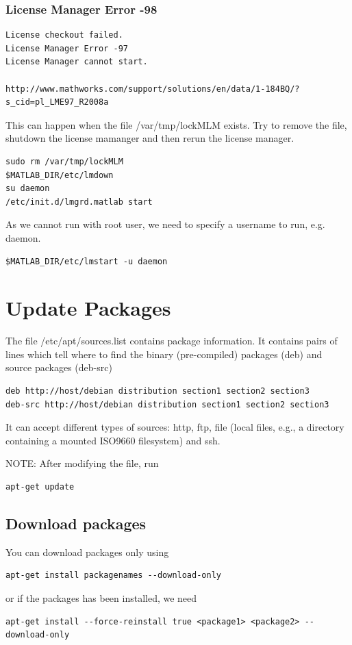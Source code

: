\subsubsection{License Manager Error -98}

\begin{verbatim}
License checkout failed.
License Manager Error -97
License Manager cannot start.

http://www.mathworks.com/support/solutions/en/data/1-184BQ/?s_cid=pl_LME97_R2008a
\end{verbatim}
This can happen when the file /var/tmp/lockMLM exists. Try to remove the file,
shutdown the license mamanger and then rerun the license manager.
\begin{verbatim}
sudo rm /var/tmp/lockMLM
$MATLAB_DIR/etc/lmdown
su daemon
/etc/init.d/lmgrd.matlab start
\end{verbatim}
As we cannot run with root user, we need to specify a username to run, e.g.
daemon.
\begin{verbatim}
$MATLAB_DIR/etc/lmstart -u daemon
\end{verbatim}

\section{Update Packages}

The file /etc/apt/sources.list contains package information. It contains pairs
of lines which tell where to find the binary (pre-compiled) packages (deb) and
source packages (deb-src)
\begin{verbatim}
deb http://host/debian distribution section1 section2 section3
deb-src http://host/debian distribution section1 section2 section3
\end{verbatim}
It can accept different types of sources:  http, ftp, file (local files, e.g., a
directory containing a mounted ISO9660 filesystem) and ssh.

NOTE: After modifying the file, run 
\begin{verbatim}
apt-get update
\end{verbatim}

\subsection{Download packages}

You can download packages only using
\begin{verbatim}
apt-get install packagenames --download-only
\end{verbatim}
or if the packages has been installed, we need
\begin{verbatim}
apt-get install --force-reinstall true <package1> <package2> --download-only
\end{verbatim}

